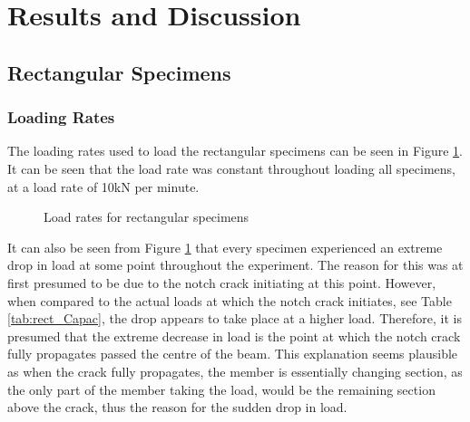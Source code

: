 \documentclass[11pt,a4paper]{article}
\numberwithin{equation}{subsection}
\begin{document}
\section{Results and Discussion}

\subsection{Rectangular Specimens}
\subsubsection{Loading Rates}
The loading rates used to load the rectangular specimens can be seen in Figure \ref{fig:Rect_load}. It can be seen that the load rate was constant throughout loading all specimens, at a load rate of 10kN per minute. 

\begin{figure}[h]
	\begin{center}
	\end{center}
	\caption{Load rates for rectangular specimens}
	\label{fig:Rect_load}
\end{figure}

\noindent
It can also be seen from Figure \ref{fig:Rect_load} that every specimen experienced an extreme drop in load at some point throughout the experiment. The reason for this was at first presumed to be due to the notch crack initiating at this point. However, when compared to the actual loads at which the notch crack initiates, see Table \ref{tab:rect_Capac}, the drop appears to take place at a higher load. Therefore, it is presumed that the extreme decrease in load is the point at which the notch crack fully propagates passed the centre of the beam. This explanation seems plausible as when the crack fully propagates, the member is essentially changing section, as the only part of the member taking the load, would be the remaining section above the crack, thus the reason for the sudden drop in load.  
\end{document}
